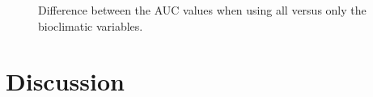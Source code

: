\begin{figure}[!htb]
\center
{}
\caption{\label{fig:PrAbAUC}Difference between the AUC values when using all versus only the bioclimatic variables.}
\end{figure}

\section{Discussion}






